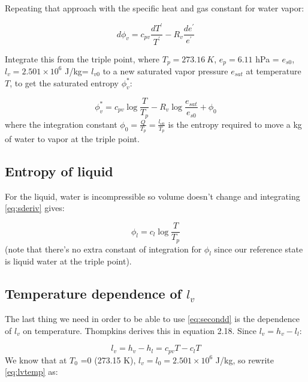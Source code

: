 \documentclass[12pt]{article}
\begin{document}
Repeating that approach with the specific heat and gas constant for water vapor:

\begin{equation}
\label{eq:sderiv}
  d\phi_v  = c_{pv}    \frac{dT^\prime}{T^\prime} -   R_v\frac{ de^\prime}{e^\prime} 
\end{equation}

Integrate this from the triple point, where $T_p=273.16\ K$, $e_p = 6.11$ hPa
= $e_{s0}$,  $l_v=2.501 \times 10^6$ J/kg= $l_{v0}$ to a new saturated vapor pressure
$e_{sat}$ at temperature $T$, to get the saturated entropy $\phi_v^*$:

\begin{equation}
  \label{eq:int}
\phi_v^* = c_{pv} \log \frac{T }{T_p} - R_v \log \frac{ e_{sat} }{e_{s0}} + \phi_0
\end{equation}
where the integration constant $\phi_0 = \frac{Q }{T_p}  = \frac{l_{v0} }{T_p}$ is the
entropy required to move a kg of water to vapor at the triple point.

\subsection{Entropy of liquid}
\label{sec:entropy-liquid}

For the liquid, water is incompressible so volume doesn't change and integrating \eqref{eq:sderiv} gives:

\begin{equation}
\label{eq:sl}
  \phi_l = c_l \log \frac{T }{T_p} 
\end{equation}
(note that there's no extra constant of integration for $\phi_l$ since our reference state is liquid water
at the triple point).

\subsection{Temperature dependence of $l_v$}
\label{sec:temp-depend-l_v}

The last thing we need in order to be able to use \eqref{eq:secondd} is the dependence of $l_v$ on temperature.
Thompkins derives this in equation 2.18.  Since $l_v = h_v - l_l$:

\begin{equation}
  \label{eq:lvtemp}
  l_v = h_v - h_l = c_{pv}T  - c_l T
\end{equation}
We know that at $T_0$ =0 \degc (273.15 K), $l_v = l_0 = 2.501 \times 10^{6}$ J/kg, so rewrite \eqref{eq:lvtemp} as:
\end{document}
